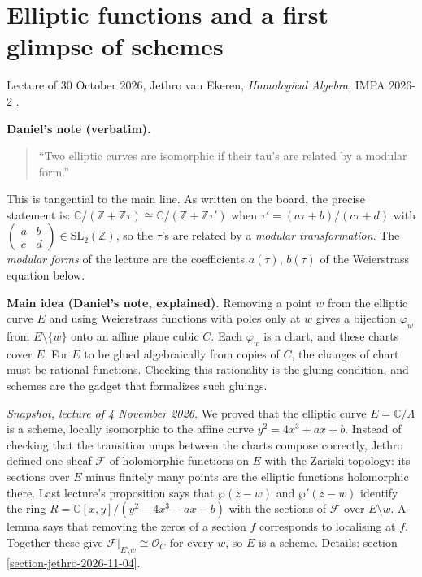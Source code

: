 \section{Elliptic functions and a first glimpse of schemes}
\label{section-elliptic-functions-jethro}

\noindent
Lecture of 30 October 2026, Jethro van
Ekeren, \emph{Homological Algebra}, IMPA
2026-2
\cite{vanEkerenHomologicalAlgebra2026}.

\medskip\noindent
{\bf Daniel's note (verbatim).}
\begin{quote}
``Two elliptic curves are isomorphic if
their tau's are related by a modular form.''
\end{quote}
This is tangential to the main line. As
written on the board, the precise statement
is: $\mathbb{C}/(\mathbb{Z} +
\mathbb{Z}\tau) \cong \mathbb{C}/(\mathbb{Z}
+ \mathbb{Z}\tau')$ when
$\tau' = (a\tau+b)/(c\tau+d)$ with
$\left(\begin{smallmatrix} a & b \\ c & d
\end{smallmatrix}\right) \in
\mathrm{SL}_2(\mathbb{Z})$, so the $\tau$'s
are related by a \emph{modular
transformation}. The \emph{modular forms} of
the lecture are the coefficients $a(\tau)$,
$b(\tau)$ of the Weierstrass equation below.

\medskip\noindent
{\bf Main idea (Daniel's note, explained).}
Removing a point $w$ from the elliptic curve
$E$ and using Weierstrass functions with
poles only at $w$ gives a bijection
$\varphi_w$ from $E \setminus \{w\}$ onto an
affine plane cubic $C$. Each $\varphi_w$ is
a chart, and these charts cover $E$. For $E$
to be glued algebraically from copies of
$C$, the changes of chart must be rational
functions. Checking this rationality is the
gluing condition, and schemes are the gadget
that formalizes such gluings.

\medskip\noindent
\textit{Snapshot, lecture of 4 November
2026.} We proved that the elliptic curve
$E=\mathbb{C}/\Lambda$ is a scheme, locally
isomorphic to the affine curve
$y^2=4x^3+ax+b$. Instead of checking that the
transition maps between the charts compose
correctly, Jethro defined one sheaf
$\mathcal{F}$ of holomorphic functions on $E$
with the Zariski topology: its sections over
$E$ minus finitely many points are the
elliptic functions holomorphic there. Last
lecture's proposition says that $\wp(z-w)$
and $\wp'(z-w)$ identify the ring
$R=\mathbb{C}[x,y]/(y^2-4x^3-ax-b)$ with the
sections of $\mathcal{F}$ over $E\setminus
w$. A lemma says that removing the zeros of a
section $f$ corresponds to localising at $f$.
Together these give $\mathcal{F}|_{E\setminus
w}\cong \mathcal{O}_C$ for every $w$, so $E$
is a scheme. Details: section
\ref{section-jethro-2026-11-04}.

